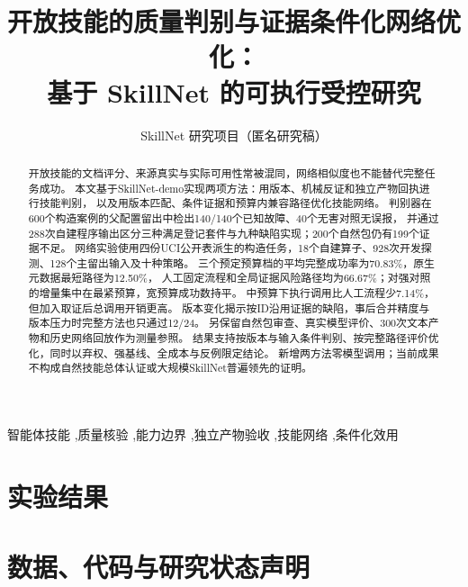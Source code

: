 \documentclass[a4paper,fleqn]{cas-dc}
\begin{document}
\let\WriteBookmarks\relax
\def\floatpagepagefraction{1}
\def\textpagefraction{.01}
\title[mode=title]{开放技能的质量判别与证据条件化网络优化：\texorpdfstring{\\}{ }基于 SkillNet 的可执行受控研究}
\author{SkillNet 研究项目（匿名研究稿）}
\begin{abstract}
开放技能的文档评分、来源真实与实际可用性常被混同，网络相似度也不能替代完整任务成功。
本文基于SkillNet-demo实现两项方法：用版本、机械反证和独立产物回执进行技能判别，
以及用版本匹配、条件证据和预算内兼容路径优化技能网络。
判别器在600个构造案例的父配置留出中检出140/140个已知故障、40个无害对照无误报，
并通过288次自建程序输出区分三种满足登记套件与九种缺陷实现；200个自然包仍有199个证据不足。
网络实验使用四份UCI公开表派生的构造任务，18个自建算子、928次开发探测、128个主留出输入及十种策略。
三个预定预算档的平均完整成功率为70.83\%，原生元数据最短路径为12.50\%，
人工固定流程和全局证据风险路径均为66.67\%；对强对照的增量集中在最紧预算，宽预算成功数持平。
中预算下执行调用比人工流程少7.14\%，但加入取证后总调用开销更高。
版本变化揭示按ID沿用证据的缺陷，事后合并精度与版本压力时完整方法也只通过12/24。
另保留自然包审查、真实模型评价、300次文本产物和历史网络回放作为测量参照。
结果支持按版本与输入条件判别、按完整路径评价优化，同时以弃权、强基线、全成本与反例限定结论。
新增两方法零模型调用；当前成果不构成自然技能总体认证或大规模SkillNet普遍领先的证明。
\end{abstract}
\begin{keywords}
智能体技能 \sep 质量核验 \sep 能力边界 \sep 独立产物验收 \sep 技能网络 \sep 条件化效用
\end{keywords}
\maketitle
\gdef\lastpage{\pageref*{LastPage}}







\section{实验结果}




\section*{数据、代码与研究状态声明}



\clearpage
\appendix

\end{document}
